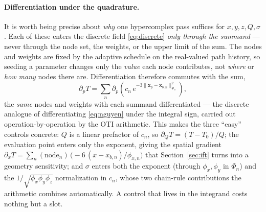 \documentclass[11pt]{article}
\begin{document}
\paragraph{Differentiation under the quadrature.} It is worth being precise
about \emph{why} one hypercomplex pass suffices for $x,y,z,Q,\sigma$. Each of
these enters the discrete field \eqref{eq:discrete} \emph{only through the
summand} --- never through the node set, the weights, or the upper limit of
the sum. The nodes and weights are fixed by the adaptive schedule on the
real-valued path history, so seeding a parameter changes only the \emph{value}
each node contributes, not \emph{where} or \emph{how many} nodes there are.
Differentiation therefore commutes with the sum,
\begin{equation}
  \partial_p T = \sum_{n}
    \partial_p\!\left(c_n\, e^{-3\|\mathbf{x}_p-\mathbf{x}_{b,n}\|^2_{\Phi_n}}\right),
  \label{eq:diffundersum}
\end{equation}
the \emph{same} nodes and weights with each summand differentiated --- the
discrete analogue of differentiating \eqref{eq:nguyen} under the integral sign,
carried out operation-by-operation by the OTI arithmetic. This makes the three
``easy'' controls concrete: $Q$ is a linear prefactor of $c_n$, so
$\partial_Q T = (T-T_0)/Q$; the evaluation point enters only the exponent,
giving the spatial gradient $\partial_x T = \sum_n(\text{node}_n)\,
\bigl(-6\,(x-x_{b,n})/\phi_{x,n}\bigr)$ that Section~\ref{sec:ift} turns into a
geometry sensitivity; and $\sigma$ enters both the exponent (through
$\phi_x,\phi_y$ in $\Phi_n$) and the $1/\sqrt{\phi_x\phi_y\phi_z}$ normalization
in $c_n$, whose two chain-rule contributions the arithmetic combines
automatically. A control that lives in the integrand costs nothing but a slot.
\end{document}
